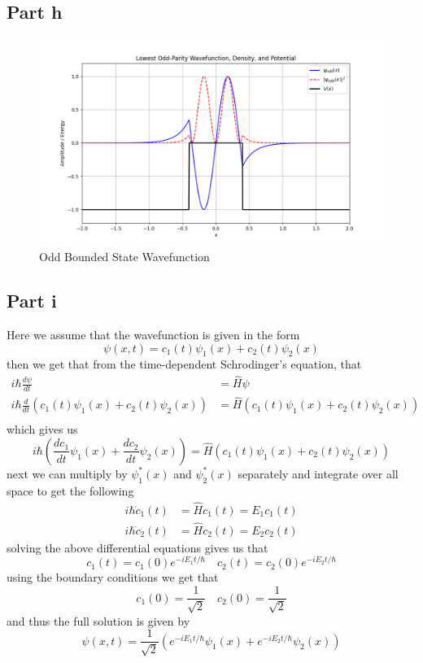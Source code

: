 \documentclass[12pt]{report}
\begin{document}
\subsection*{Part h}
\begin{figure}[H]
  \centering
  \includegraphics[scale=0.6]{odd.png}
  \caption{Odd Bounded State Wavefunction}
  \label{fig:enter-label}
\end{figure}
\subsection*{Part i}
Here we assume that the wavefunction is given in the form
\begin{equation*}
  \psi(x,t) = c_1(t) \psi_1(x) + c_2(t) \psi_2(x)
\end{equation*}
then we get that from the time-dependent Schrodinger's equation, that
\begin{align*}
  i\hbar \frac{d\psi}{dt} &= \hat{H}\psi \\
  i\hbar \frac{d}{dt} (c_1(t) \psi_1(x) + c_2(t)\psi_2(x)) &= \hat{H}(c_1(t) \psi_1(x) + c_2(t)\psi_2(x)) \\
\end{align*}
which gives us
\begin{equation*}
  i\hbar \left(\frac{dc_1}{dt}\psi_1(x) + \frac{dc_2}{dt}\psi_2(x) \right) = \hat{H}(c_1(t) \psi_1(x) + c_2(t)\psi_2(x))
\end{equation*}
next we can multiply by $\psi_1^*(x)$ and $\psi_2^*(x)$ separately and integrate over all space to get the following
\begin{align*}
  i\hbar \dot{c}_1(t) &= \hat{H}c_1(t) = E_1c_1(t) \\
  i\hbar \dot{c}_2(t) &= \hat{H}c_2(t) = E_2c_2(t)
\end{align*}
solving the above differential equations gives us that
\begin{equation*}
  c_1(t) = c_1(0)e^{-iE_1t/\hbar} \quad c_2(t) = c_2(0)e^{-iE_2t/\hbar}
\end{equation*}
using the boundary conditions we get that
\begin{equation*}
  c_1(0) = \frac{1}{\sqrt{2}} \quad c_2(0) = \frac{1}{\sqrt{2}}
\end{equation*}
and thus the full solution is given by
\begin{equation*}
  \psi(x,t) = \frac{1}{\sqrt{2}}\left(e^{-iE_1t/\hbar}\psi_1(x) + e^{-iE_2t/\hbar}\psi_2(x)\right)
\end{equation*}
\end{document}
